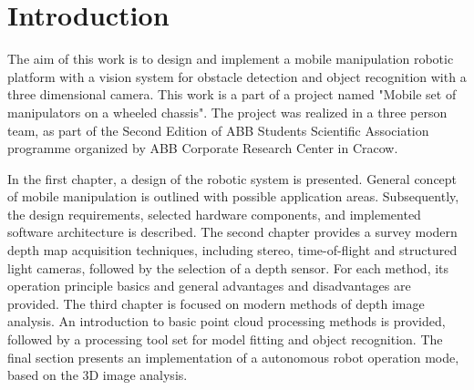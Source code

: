 \chapter*{Introduction}
\label{cha:introduction}



The aim of this work is to design and implement a mobile manipulation robotic platform with a vision system for obstacle detection and object recognition with a three dimensional camera. This work is a part of a project named "Mobile set of manipulators on a wheeled chassis". The project was realized in a three person team, as part of the Second Edition of ABB Students Scientific Association programme organized by ABB Corporate Research Center in Cracow.

	In the first chapter, a design of the robotic system is presented. General concept of mobile manipulation is outlined with possible application areas. Subsequently, the design requirements, selected hardware components, and implemented software architecture is described. The second chapter provides a survey modern depth map acquisition techniques, including stereo, time-of-flight and structured light cameras, followed by the selection of a depth sensor. For each method, its operation principle basics and general advantages and disadvantages are provided. The third chapter is focused on modern methods of depth image analysis. An introduction to basic point cloud processing methods is provided, followed by a processing tool set for model fitting and object recognition. The final section presents an implementation of a autonomous robot operation mode, based on the 3D image analysis.
	
	
\begin{comment}

Tematem pracy jest opis wybranych elementów składowych projektu o nazwie: Mobilny zespół manipulatorów na wspólnej platformie jezdnej. Projekt ten zrealizowany został w ramach Drugiej Edycji Koła Naukowego ABB we współpracy z Korporacyjnym Centrum Badawczym ABB w Krakowie. Zespół projektowy składał się z trzech osób pomiędzy które zostały podzielone zadania. Na tej podstawie zrealizowane zostały trzy prace dyplomowe inżynierskie. Niniejsza, związana z projektem mechanicznym, samodzielnym montażem wszystkich podzespołów oraz z analizą zagadnień kinematycznych zespołu dwóch skonstruowanych manipulatorów oraz dwie inne prace związane z oprogramowaniem operatorskim oraz z systemem akwizycji i przetwarzania danych. Projekt był realizowany w okresie od marca do listopada 2014 roku i jego główną częścią było uruchomienie zbudowanego urządzenia i jego prezentacja podczas uroczystego podsumowania.

\end{comment}









